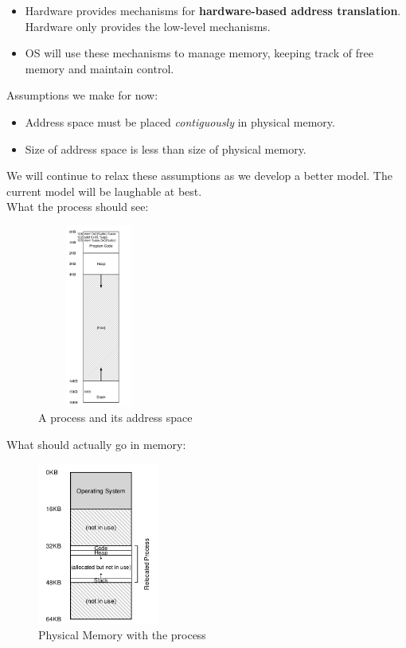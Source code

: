 \begin{itemize}
    \item Hardware provides mechanisms for \textbf{hardware-based address
        translation}. Hardware only provides the low-level mechanisms.
    \item OS will use these mechanisms to manage memory, keeping track of free
        memory and maintain control.
\end{itemize}

Assumptions we make for now:

\begin{itemize}
    \item Address space must be placed \textit{contiguously} in physical
        memory.
    \item Size of address space is less than size of physical memory.
\end{itemize}

We will continue to relax these assumptions as we develop a better model. The
current model will be laughable at best.\\

What the process should see:

\begin{figure}[h!]
    \begin{center}
        \includegraphics[width=4cm, height=6cm]{img/151.png}
        \caption{A process and its address space}
    \end{center}
\end{figure}

What should actually go in memory:

\begin{figure}[h!]
    \begin{center}
        \includegraphics[width=4cm]{img/152.png}
        \caption{Physical Memory with the process}
        \label{152}
    \end{center}
\end{figure}


